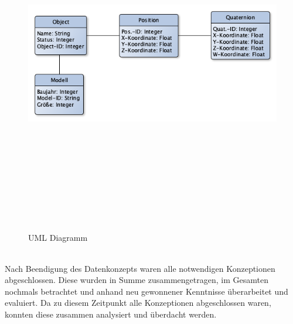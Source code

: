 \begin{figure}[hbt!]
    \centering
    \includegraphics[width=15cm,height=15cm,keepaspectratio]{3Konzeption/Bilder/UML_BA.png}
    \caption{UML Diagramm}
    \label{pic:erm}
\end{figure}
\\
Nach Beendigung des Datenkonzepts waren alle notwendigen Konzeptionen abgeschlossen. Diese wurden in Summe zusammengetragen, im Gesamten nochmals 
betrachtet und anhand neu gewonnener Kenntnisse überarbeitet und evaluiert. Da zu diesem Zeitpunkt alle Konzeptionen abgeschlossen 
waren, konnten diese zusammen analysiert und überdacht werden. 
